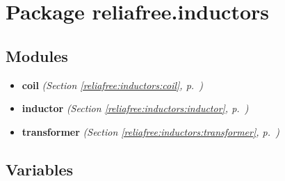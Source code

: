 %
%
%


\section{Package reliafree.inductors}

    \label{reliafree:inductors}


\subsection{Modules}

\begin{itemize}
\setlength{\parskip}{0ex}
\item \textbf{coil}
  \textit{(Section \ref{reliafree:inductors:coil}, p.~\pageref{reliafree:inductors:coil})}

\item \textbf{inductor}
  \textit{(Section \ref{reliafree:inductors:inductor}, p.~\pageref{reliafree:inductors:inductor})}

\item \textbf{transformer}
  \textit{(Section \ref{reliafree:inductors:transformer}, p.~\pageref{reliafree:inductors:transformer})}

\end{itemize}



  \subsection{Variables}

